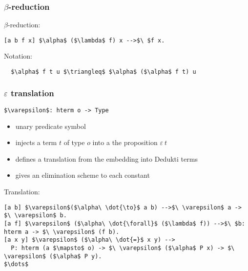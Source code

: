 \begin{frame}[fragile]
\frametitle{$\beta$-reduction}

\begin{block}{$\beta$-reduction:}
\begin{lstlisting}
[a b f x] $\alpha$ ($\lambda$ f) x -->$\ $f x.
\end{lstlisting}
\end{block}

\vspace{0.5cm}

\begin{block}{Notation:}
\begin{lstlisting}
  $\alpha$ f t u $\triangleq$ $\alpha$ ($\alpha$ f t) u
\end{lstlisting}
\end{block}
\end{frame}


\begin{frame}[fragile]
\frametitle{$\varepsilon$ translation}

\lstinline!$\varepsilon$: hterm o -> Type!
\begin{itemize}
\item unary predicate symbol
\item injects a term $t$ of type $o$ into a the proposition
  $\varepsilon\ t$
\item defines a translation from the embedding into Dedukti terms
\item \alert{gives an elimination scheme to each constant}
\end{itemize}

\vspace{0.5cm}

\begin{block}{Translation:}
\begin{lstlisting}
[a b] $\varepsilon$($\alpha\ \dot{\to}$ a b) -->$\ \varepsilon$ a -> $\ \varepsilon$ b.
[a f] $\varepsilon$ ($\alpha\ \dot{\forall}$ ($\lambda$ f)) -->$\ $b: hterm a -> $\ \varepsilon$ (f b).
[a x y] $\varepsilon$ ($\alpha\ \dot{=}$ x y) -->
  P: hterm (a $\mapsto$ o) -> $\ \varepsilon$ ($\alpha$ P x) -> $\ \varepsilon$ ($\alpha$ P y).
$\dots$
\end{lstlisting}
\end{block}

\end{frame}


